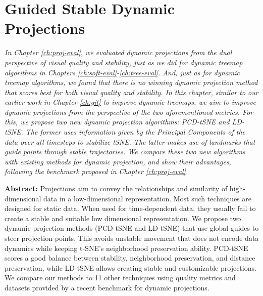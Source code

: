 \chapter{Guided Stable Dynamic Projections}
\label{ch:proj-algo}

\textit{
In Chapter \ref{ch:proj-eval}, we evaluated dynamic projections from the dual perspective of visual quality and stability, just as we did for dynamic treemap algorithms in Chapters \ref{ch:soft-eval}-\ref{ch:tree-eval}. And, just as for dynamic treemap algorithms, we found that there is no winning dynamic projection method that scores best for both visual quality and stability. In this chapter, similar to our earlier work in Chapter \ref{ch:git} to improve dynamic treemaps, we aim to improve dynamic projections from the perspective of the two aforementioned metrics. For this, we propose two new dynamic projection algorithms: PCD-tSNE and LD-tSNE. The former uses information given by the Principal Components of the data over all timesteps to stabilize tSNE. The latter makes use of landmarks that guide points through stable trajectories. We compare these two new algorithms with existing methods for dynamic projection, and show their advantages, following the benchmark proposed in Chapter \ref{ch:proj-eval}.
}

\vspace{5mm} %


\noindent \textbf{Abstract:}
Projections aim to convey the relationships and similarity of high-dimensional data in a low-dimensional representation.
Most such techniques are designed for static data. When used for time-dependent data, they usually fail to create a stable and suitable low dimensional representation.
We propose two dynamic projection methods (PCD-tSNE and LD-tSNE) that use global guides to steer projection points. This avoids unstable movement that does not encode data dynamics while keeping t-SNE's neighborhood preservation ability. PCD-tSNE scores a good balance between stability, neighborhood preservation, and distance preservation, while LD-tSNE allows creating stable and customizable projections. We compare our methods to 11 other techniques using quality metrics and datasets provided by a recent benchmark for dynamic projections.
    
